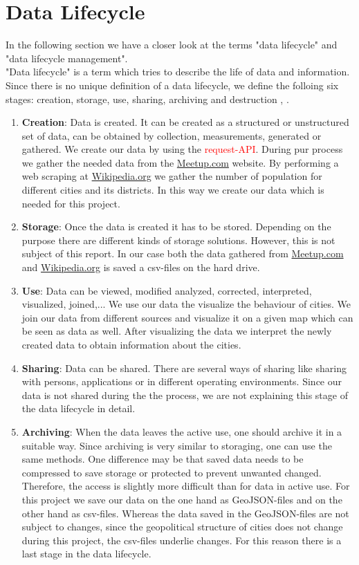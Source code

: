 \section{Data Lifecycle}\label{sec:datalifecycle}


In the following section we have a closer look at the terms "data lifecycle" and "data lifecycle management".\\"Data lifecycle" is a term which tries to describe the life of data and information. Since there is no unique definition of a data lifecycle, we define the folloing six stages: creation, storage, use, sharing, archiving and destruction  \cite{marburg}, \cite{spirion}.

\begin{enumerate}
	\item \textbf{Creation}: Data is created. It can be created as a structured or unstructured set of data, can be obtained by collection, measurements, generated or gathered. We create our data by using the \textcolor{red}{request-API}. During pur process we gather the needed data from the \url{Meetup.com} website. By performing a web scraping at \url{Wikipedia.org} we gather the number of population for different cities and its districts. In this way we create our data which is needed for this project.
	\item \textbf{Storage}: Once the data is created it has to be stored. Depending on the purpose there are different kinds of storage solutions. However, this is not subject of this report. In our case both the data gathered from \url{Meetup.com} and \url{Wikipedia.org} is saved a csv-files on the hard drive.
	\item \textbf{Use}: Data can be viewed, modified analyzed, corrected, interpreted, visualized, joined,... We use our data the visualize the behaviour of cities. We join our data from different sources and visualize it on a given map which can be seen as data as well. After visualizing the data we interpret the newly created data to obtain information about the cities.
	\item \textbf{Sharing}: Data can be shared. There are several ways of sharing like sharing with persons, applications or in different operating environments. Since our data is not shared during the the process, we are not explaining this stage of the data lifecycle in detail.
	\item \textbf{Archiving}: When the data leaves the active use, one should archive it in a suitable way. Since archiving is very similar to storaging, one can use the same methods. One difference may be that saved data needs to be compressed to save storage or protected to prevent unwanted changed. Therefore, the access is slightly more difficult than for data in active use. For this project we save our data on the one hand as GeoJSON-files and on the other hand as csv-files. Whereas the data saved in the GeoJSON-files are not subject to changes, since the geopolitical structure of cities does not change during this project, the csv-files underlie changes. For this reason there is a last stage in the data lifecycle.

\end{enumerate}
